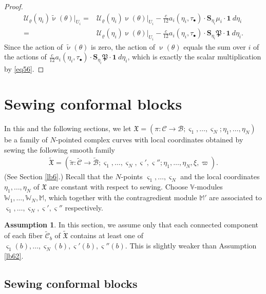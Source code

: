 \documentclass[12pt,a4paper,notitlepage]{article}
\theoremstyle{definition}
\newtheorem{ass}[df]{Assumption}
\theoremstyle{plain}
\newcommand{\fk}{\mathfrak}
\newcommand{\mc}{\mathcal}
\newcommand{\wtd}{\widetilde}
\newcommand{\id}{\mathbf{1}}
\newcommand{\sgm}{\varsigma}
\newcommand{\blt}{\bullet}
\newcommand{\Vbb}{\mathbb V}
\newcommand{\Wbb}{\mathbb W}
\newcommand{\Mbb}{\mathbb M}
\newcommand{\Sbf}{\mathbf{S}}
\numberwithin{equation}{section}
\begin{document}
\begin{proof}
	\begin{align*}
	\mc U_\varrho(\eta_i)\wtd\upnu(\theta)|_{U_i}=&\mc U_\varrho(\eta_i)\upnu(\theta)|_{U_i}-\frac{c}{12} a_i(\eta_i,\tau_\blt)\cdot\Sbf_{\eta_i}\mu_i\cdot \id~d{\eta_i}\\
	=&\mc U_\varrho(\eta_i)\upnu(\theta)|_{U_i}-\frac{c}{12} a_i(\eta_i,\tau_\blt)\cdot\Sbf_{\eta_i}\fk P\cdot \id~d{\eta_i}.
	\end{align*}
	Since the action of $\wtd\upnu(\theta)$ is zero, the action of $\upnu(\theta)$ equals the sum over $i$ of the actions of $\frac{c}{12} a_i(\eta_i,\tau_\blt)\cdot\Sbf_{\eta_i}\fk P\cdot \id~d{\eta_i}$, which is exactly the scalar multiplication by \eqref{eq56}.
\end{proof}





\section{Sewing conformal blocks}\label{lb35}


In this and the following sections, we let $\fk X=(\pi:\mc C\rightarrow\mc B;\sgm_1,\dots,\sgm_N;\eta_1,\dots,\eta_N)$ be a family of $N$-pointed complex curves with local coordinates obtained by sewing the following smooth family
\begin{align*}
\wtd{\fk X}=(\wtd\pi:\wtd{\mc C}\rightarrow\wtd{\mc B};\sgm_1,\dots,\sgm_N,\sgm',\sgm'';\eta_1,\dots,\eta_N,\xi,\varpi).
\end{align*}
(See Section \ref{lb6}.) Recall that the $N$-points  $\sgm_1,\dots,\sgm_N$ and the local coordinates $\eta_1,\dots,\eta_N$ of $\fk X$ are constant with respect to sewing. Choose $\Vbb$-modules $\Wbb_1,\dots,\Wbb_N,\Mbb$, which together with the contragredient module $\Mbb'$ are associated to $\sgm_1,\dots,\sgm_N,\sgm',\sgm''$ respectively. 

\begin{ass}\label{lb63}
In this section, we assume only that each connected component of each fiber $\wtd{\mc C}_b$ of $\wtd{\fk X}$ contains at least one of $\sgm_1(b),\dots,\sgm_N(b),\sgm'(b),\sgm''(b)$. This is slightly weaker than Assumption \ref{lb62}.
\end{ass}



\subsection*{Sewing conformal blocks}
\end{document}
